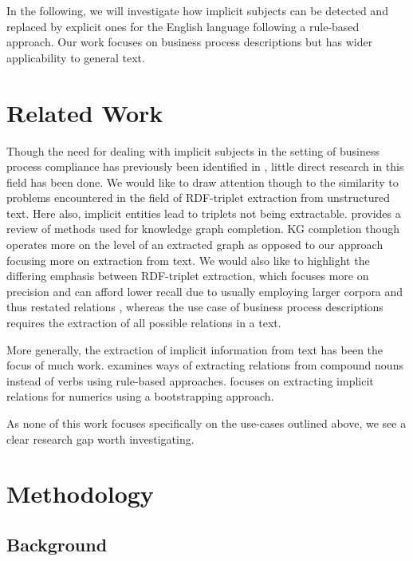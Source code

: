 \documentclass[times, 10pt,twocolumn]{article}
\begin{document}
In the following, we will investigate how implicit subjects can be detected and replaced
by explicit ones for the English language following a rule-based approach.
Our work focuses on business process descriptions but has wider applicability to general text.



\section{Related Work}
Though the need for dealing with implicit subjects in the setting of business process compliance
has previously been identified in \cite{sai_deviations_regulations}, little direct research in this
field has been done. We would like to draw attention though to the similarity to problems encountered
in the field of RDF-triplet extraction from unstructured text. Here also, implicit entities
lead to triplets not being extractable. \cite{kg_completion} provides a review of methods used
for knowledge graph completion. KG completion though operates more on the level of an extracted
graph as opposed to our approach focusing more on extraction from text. We would also like to
highlight the differing emphasis between RDF-triplet extraction, which focuses more on precision
and can afford lower recall due to usually employing larger corpora and thus restated relations
\cite{banko}, whereas the use case of business process descriptions requires the extraction of all
possible relations in a text.

More generally, the extraction of implicit information from text has been the focus of
much work. \cite{pal-mausam-2016-demonyms} examines ways of extracting relations from
compound nouns instead of verbs using rule-based approaches. \cite{saha-etal-2017-bootstrapping}
focuses on extracting implicit relations for numerics using a bootstrapping approach.

As none of this work focuses specifically on the use-cases outlined above, we 
see a clear research gap worth investigating.



\section{Methodology}
\subsection{Background}\label{methodology:background}
\end{document}
